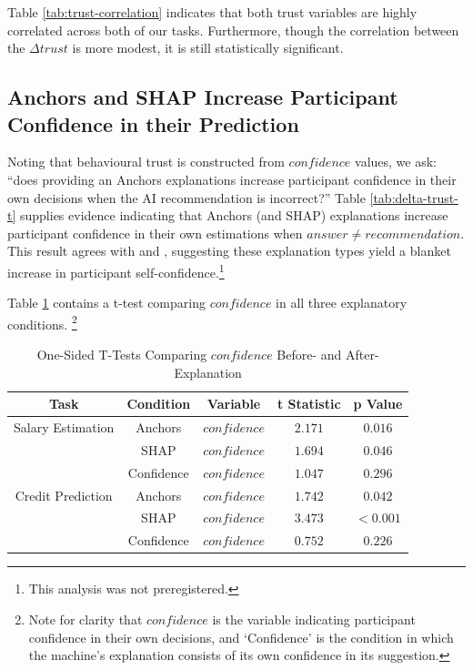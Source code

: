 Table \ref{tab:trust-correlation} indicates that both trust variables are highly correlated across both of our tasks. Furthermore, though the correlation between the $\Delta trust$ is more modest, it is still statistically significant.

\subsection{Anchors and SHAP Increase Participant Confidence in their Prediction}

Noting that behavioural trust is constructed from $confidence$ values, we ask: ``does providing an Anchors explanations increase participant confidence in their own decisions when the AI recommendation is incorrect?'' Table \ref{tab:delta-trust-t} supplies evidence indicating that Anchors (and SHAP) explanations increase participant confidence in their own estimations when $answer \neq recommendation$. This result agrees with \textcite{wan_explainabilitys_2022} and \textcite{bansal_does_2021}, suggesting these explanation types yield a blanket increase in participant self-confidence.\footnote{This analysis was not preregistered.}

Table \ref{tab:delta-confidence-t} contains a t-test comparing $confidence$ in all three explanatory conditions. \footnote{Note for clarity that $confidence$ is the variable indicating participant confidence in their own decisions, and `Confidence' is the condition in which the machine's explanation consists of its own confidence in its suggestion.}

\begin{table}[htbp]
    \caption{One-Sided T-Tests Comparing $confidence$ Before- and After-Explanation}
    \begin{center}
    \begin{tabular}{ccccc}
        \toprule
        Task & Condition & Variable & t Statistic & p Value \\
        \midrule
        Salary Estimation & Anchors & $confidence$ & $\mathbf{2.171}$ & $\mathbf{0.016}$ \\
        & SHAP & $confidence$ & $\mathbf{1.694}$ & $\mathbf{0.046}$ \\
        & Confidence & $confidence$ & $1.047$ & $0.296$ \\
        \midrule
        Credit Prediction & Anchors & $confidence$ & $\mathbf{1.742}$ & $\mathbf{0.042}$ \\
        & SHAP & $confidence$ & $\mathbf{3.473}$ & $\mathbf{<0.001}$ \\
        & Confidence & $confidence$ & $0.752$ & $0.226$ \\
        \bottomrule
    \end{tabular}
    \label{tab:delta-confidence-t}
    \end{center}
\end{table}

